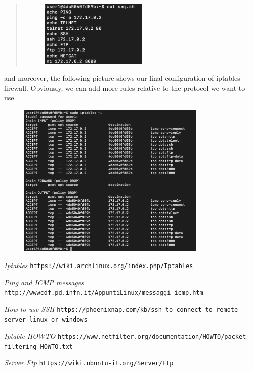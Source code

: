 \documentclass[11pt]{article}
\begin{document}
\begin{quote}
 \begin{figure}[!ht]
 \centering
 \includegraphics[width=0.5\textwidth]{pic10-hw8-1635747.png}
 \label{fig:conf}
 \end{figure}
\end{quote}

and moreover, the following picture shows our final configuration of iptables firewall. Obviously, we can add more rules relative to the protocol we want to use.

\begin{figure}[!ht]
 \centering
 \includegraphics[width=0.8\textwidth]{pic9-hw8-1635747.png}
 \label{fig:conf}
\end{figure}

\vfill
\begin{thebibliography}{99}

{\em Iptables} \newline
\verb|https://wiki.archlinux.org/index.php/Iptables|

{\em Ping and ICMP messages} \newline
\verb|http://wwwcdf.pd.infn.it/AppuntiLinux/messaggi_icmp.htm|

{\em How to use SSH} \newline
\verb|https://phoenixnap.com/kb/ssh-to-connect-to-remote-server-linux-or-windows|

{\em Iptable HOWTO} \newline
\verb|https://www.netfilter.org/documentation/HOWTO/packet-filtering-HOWTO.txt|

{\em Server Ftp}\newline
\verb|https://wiki.ubuntu-it.org/Server/Ftp|

\end{thebibliography}
\end{document}
